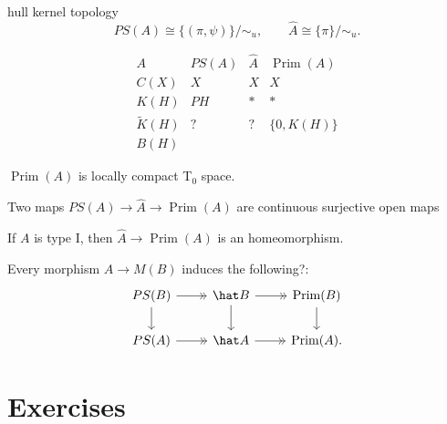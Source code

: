\documentclass{../../large}
\newcommand{\Prim}{\operatorname{Prim}}
\begin{document}
\begin{prb}
hull kernel topology
\[PS(A)\cong\{(\pi,\psi)\}/\sim_u,\qquad\hat A\cong\{\pi\}/\sim_u.\]

\[\begin{array}{c|ccc}
A & PS(A) & \hat A & \Prim(A) \\\hline
C(X) & X & X & X \\
K(H) & PH & * & * \\
\tilde K(H) & ? & ? & \{0,K(H)\} \\
B(H) &&&
\end{array}\]
\begin{parts}
\item $\Prim(A)$ is locally compact T$_0$ space.
\item Two maps $PS(A)\to\hat A\to\Prim(A)$ are continuous surjective open maps
\item If $A$ is type I, then $\hat A\to\Prim(A)$ is an homeomorphism.
\end{parts}

\end{prb}




Every morphism $A\to M(B)$ induces the following?:
\[\begin{tikzcd}
PS(B) \rar[->>]\dar & \hat B \rar[->>]\dar & \Prim(B) \dar \\
PS(A) \rar[->>] & \hat A \rar[->>] & \Prim(A).
\end{tikzcd}\]





\section*{Exercises}


\end{document}

